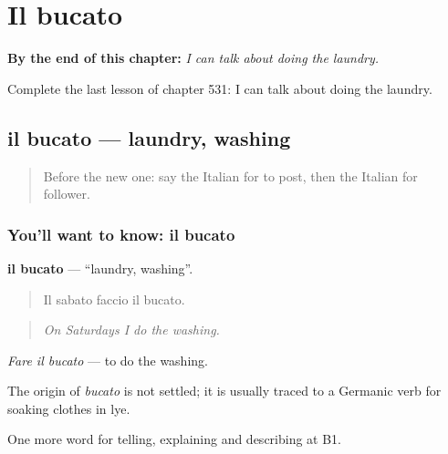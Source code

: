 
\chapter{Il bucato}
\label{ch:it-il-bucato}

\begin{chapteropening}
\textbf{By the end of this chapter:} \emph{I can talk about doing the laundry.}

Complete the last lesson of chapter 531: I can talk about doing the laundry.
\end{chapteropening}

\section[il bucato]{il bucato — laundry, washing}

\label{lesson:IT-C531-bucato}



\begin{quote}
Before the new one: say the Italian for to post, then the Italian for follower.
\end{quote}

\subsection*{You'll want to know: il bucato}
\textbf{il bucato} — \textquotedblleft{}laundry, washing\textquotedblright{}.

\begin{quote}
Il sabato faccio il bucato.
\end{quote}

\begin{quote}
\emph{On Saturdays I do the washing.}
\end{quote}

\emph{Fare il bucato} — to do the washing.

\begin{cousinweb}
The origin of \emph{bucato} is not settled; it is usually traced to a Germanic verb for soaking clothes in lye.
\end{cousinweb}

\begin{grammarlens}[title={What you've built}]
One more word for telling, explaining and describing at B1.
\end{grammarlens}


